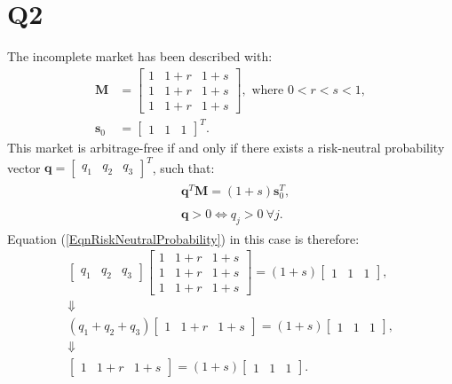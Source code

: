 \documentclass[final,3p,times]{elsarticle}
\begin{document}
\section{Q2}
	The incomplete market has been described with:
	\begin{equation}
		\begin{aligned}
			\mathbf{M}&=
				\begin{bmatrix}
					1 & 1+r & 1+s \\
					1 & 1+r & 1+s \\
					1 & 1+r & 1+s
				\end{bmatrix},
				\text{ where } 0<r<s<1
				,\\
			\mathbf{s}_0&= \begin{bmatrix} 1 & 1 & 1 \end{bmatrix}^T.
		\end{aligned}
	\end{equation}
	This market is arbitrage-free if and only if there exists a risk-neutral probability vector $\mathbf{q}=\begin{bmatrix} q_1 & q_2 & q_3\end{bmatrix}^T$, such that:
	\begin{subequations}
		\begin{align}
			\begin{split}
				\label{EqnRiskNeutralProbability}
				&\mathbf{q}^T \mathbf{M} = \left( 1+s \right) \mathbf{s}_0^T
				,
			\end{split}\\
			\begin{split}
				&\mathbf{q}>0 \iff q_j>0~\forall j
				.
			\end{split}
		\end{align}
	\end{subequations}
	Equation (\ref{EqnRiskNeutralProbability}) in this case is therefore:
	\begin{gather}
		\begin{bmatrix} q_1 & q_2 & q_3 \end{bmatrix}
		\begin{bmatrix} 1 & 1+r & 1+s \\ 1 & 1+r & 1+s \\ 1 & 1+r & 1+s \end{bmatrix}
		=
		\left(1+s\right) \begin{bmatrix} 1 & 1 & 1 \end{bmatrix},\nonumber\\
		\Downarrow\nonumber\\
		\label{EqnQ2nn1}
		\left( q_1 + q_2 + q_3 \right) \begin{bmatrix} 1 & 1+r & 1+s \end{bmatrix} = \left(1+s\right) \begin{bmatrix} 1 & 1 & 1 \end{bmatrix},\\
		\Downarrow\nonumber\\
		\label{EqnQ2nn2}
		\begin{bmatrix} 1 & 1+r & 1+s \end{bmatrix} = \left(1+s\right) \begin{bmatrix} 1 & 1 & 1 \end{bmatrix}.
	\end{gather}
\end{document}

